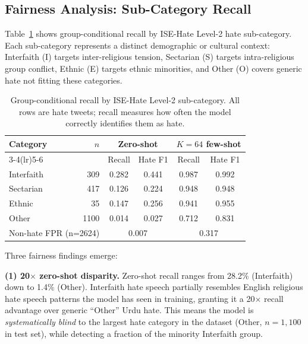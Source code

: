\documentclass{article}
\begin{document}
\subsection{Fairness Analysis: Sub-Category Recall}
\label{sec:fairness}

Table~\ref{tab:fairness} shows group-conditional recall by ISE-Hate
Level-2 hate sub-category.
Each sub-category represents a distinct demographic or cultural context:
Interfaith (I) targets inter-religious tension, Sectarian (S) targets
intra-religious group conflict, Ethnic (E) targets ethnic minorities,
and Other (O) covers generic hate not fitting these categories.

\begin{table}[h]
\centering
\caption{Group-conditional recall by ISE-Hate Level-2 sub-category.
         All rows are hate tweets; recall measures how often the model
         correctly identifies them as hate.}
\label{tab:fairness}
\vskip 0.05in
\begin{small}
\begin{tabular}{lrcccc}
\toprule
\multirow{2}{*}{Category} & \multirow{2}{*}{$n$} &
  \multicolumn{2}{c}{Zero-shot} & \multicolumn{2}{c}{$K=64$ few-shot} \\
\cmidrule(lr){3-4}\cmidrule(lr){5-6}
& & Recall & Hate F1 & Recall & Hate F1 \\
\midrule
Interfaith  & 309  & 0.282 & 0.441 & 0.987 & 0.992 \\
Sectarian   & 417  & 0.126 & 0.224 & 0.948 & 0.948 \\
Ethnic      &  35  & 0.147 & 0.256 & 0.941 & 0.955 \\
Other       & 1100 & 0.014 & 0.027 & 0.712 & 0.831 \\
\midrule
\multicolumn{2}{l}{Non-hate FPR (n=2624)} & \multicolumn{2}{c}{0.007} & \multicolumn{2}{c}{0.317} \\
\bottomrule
\end{tabular}
\end{small}
\end{table}

Three fairness findings emerge:

\textbf{(1) 20$\times$ zero-shot disparity.}
Zero-shot recall ranges from 28.2\% (Interfaith) down to 1.4\% (Other).
Interfaith hate speech partially resembles English religious hate speech
patterns the model has seen in training, granting it a 20$\times$ recall
advantage over generic ``Other'' Urdu hate.
This means the model is \emph{systematically blind} to the largest hate
category in the dataset (Other, $n=1{,}100$ in test set), while detecting
a fraction of the minority Interfaith group.
\end{document}
